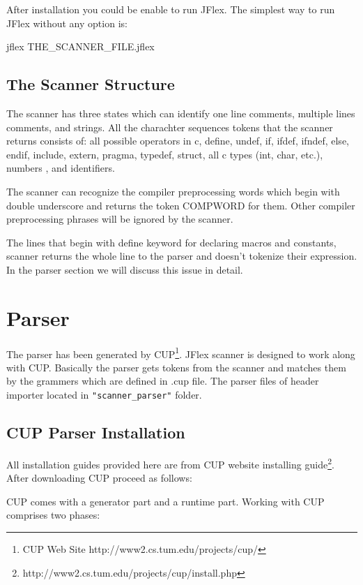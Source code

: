 \documentclass[titlepage]{article}
\begin{document}
After installation you could be enable to run JFlex. The simplest way to run JFlex without any option is:

jflex THE\_SCANNER\_FILE.jflex

\subsection{The Scanner Structure}
The scanner has three states which can identify one line comments, multiple lines comments, and strings. All the charachter sequences tokens that the scanner returns consists of: all possible operators in c, define, undef, if, ifdef, ifndef, else, endif, include, extern, pragma, typedef, struct, all c types (int, char, etc.), numbers , and identifiers.

The scanner can recognize the compiler preprocessing words which begin with double underscore and returns the token COMPWORD for them. Other compiler preprocessing phrases will be ignored by the scanner.

The lines that begin with define keyword for declaring macros and constants, scanner returns the whole line to the parser and doesn't tokenize their expression. In the parser section we will discuss this issue in detail.


\section{Parser}
The parser has been generated by CUP\footnote{CUP Web Site http://www2.cs.tum.edu/projects/cup/}. JFlex scanner is designed to work along with CUP. Basically the parser gets tokens from the scanner and matches them by the grammers which are defined in .cup file. The parser files of header importer located in \texttt{"scanner\_parser"} folder.

\subsection{CUP Parser Installation}
All installation guides provided here are from  CUP website installing guide\footnote{http://www2.cs.tum.edu/projects/cup/install.php}. After downloading CUP proceed as follows:

CUP comes with a generator part and a runtime part. Working with CUP comprises two phases:
\end{document}
